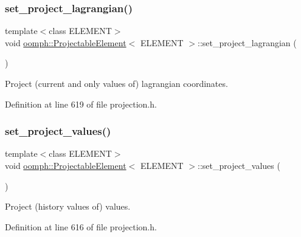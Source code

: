 \subsubsection{\texorpdfstring{set\+\_\+project\+\_\+lagrangian()}{set\_project\_lagrangian()}}
{\footnotesize\ttfamily template$<$class E\+L\+E\+M\+E\+NT$>$ \\
void \hyperlink{classoomph_1_1ProjectableElement}{oomph\+::\+Projectable\+Element}$<$ E\+L\+E\+M\+E\+NT $>$\+::set\+\_\+project\+\_\+lagrangian (\begin{DoxyParamCaption}{ }\end{DoxyParamCaption})\hspace{0.3cm}{\ttfamily [inline]}}



Project (current and only values of) lagrangian coordinates. 



Definition at line 619 of file projection.\+h.

\mbox{\label{classoomph_1_1ProjectableElement_a51fefa06ef9dc90ea400a0fa1711c232}} 
\subsubsection{\texorpdfstring{set\+\_\+project\+\_\+values()}{set\_project\_values()}}
{\footnotesize\ttfamily template$<$class E\+L\+E\+M\+E\+NT$>$ \\
void \hyperlink{classoomph_1_1ProjectableElement}{oomph\+::\+Projectable\+Element}$<$ E\+L\+E\+M\+E\+NT $>$\+::set\+\_\+project\+\_\+values (\begin{DoxyParamCaption}{ }\end{DoxyParamCaption})\hspace{0.3cm}{\ttfamily [inline]}}



Project (history values of) values. 



Definition at line 616 of file projection.\+h.

\mbox{\label{classoomph_1_1ProjectableElement_adabcd890a2193f3369dd8e1272f27f5b}} 
